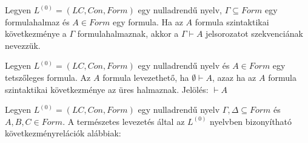 \begin{definition}[szekvencia]
Legyen $L^{(0)} = (LC, Con, Form)$ egy nulladrendű nyelv, $\Gamma \subseteq Form$ egy formulahalmaz és $A \in Form$ egy formula. Ha az $A$ formula szintaktikai következménye a $\Gamma$ formulahalmaznak, akkor a $\Gamma \vdash A$ jelsorozatot szekvenciának nevezzük. 
\end{definition}

\begin{definition}[levezethetőség]
Legyen $L^{(0)} = (LC, Con, Form)$ egy nulladrendű nyelv és $A \in Form$ egy tetszőleges formula. Az $A$ formula levezethető, ha $\emptyset \vdash A$, azaz ha az $A$ formula szintaktikai következménye az üres halmaznak. Jelölés: $\vdash A$ 
\end{definition}

\begin{definition}
Legyen $L^{(0)} = (LC, Con, Form)$ egy nulladrendű nyelv  $\Gamma, \Delta \subseteq Form$ és $A, B, C \in Form$. A természetes levezetés által az $L^{(0)}$ nyelvben bizonyítható következményrelációk alábbiak:


\end{definition}

